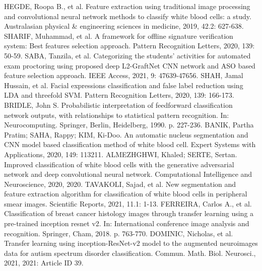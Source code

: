\documentclass[conference]{IEEEtran}
\begin{document}
\begin{thebibliography}{00}
 HEGDE, Roopa B., et al. Feature extraction using traditional image processing and convolutional neural network methods to classify white blood cells: a study. Australasian physical \& engineering sciences in medicine, 2019, 42.2: 627-638. 
 SHARIF, Muhammad, et al. A framework for offline signature verification system: Best features selection approach. Pattern Recognition Letters, 2020, 139: 50-59.
 SABA, Tanzila, et al. Categorizing the students’ activities for automated exam proctoring using proposed deep L2-GraftNet CNN network and ASO based feature selection approach. IEEE Access, 2021, 9: 47639-47656.
 SHAH, Jamal Hussain, et al. Facial expressions classification and false label reduction using LDA and threefold SVM. Pattern Recognition Letters, 2020, 139: 166-173.
 BRIDLE, John S. Probabilistic interpretation of feedforward classification network outputs, with relationships to statistical pattern recognition. In: Neurocomputing. Springer, Berlin, Heidelberg, 1990. p. 227-236.
 BANIK, Partha Pratim; SAHA, Rappy; KIM, Ki-Doo. An automatic nucleus segmentation and CNN model based classification method of white blood cell. Expert Systems with Applications, 2020, 149: 113211. 
 ALMEZHGHWI, Khaled; SERTE, Sertan. Improved classification of white blood cells with the generative adversarial network and deep convolutional neural network. Computational Intelligence and Neuroscience, 2020, 2020.
 TAVAKOLI, Sajad, et al. New segmentation and feature extraction algorithm for classification of white blood cells in peripheral smear images. Scientific Reports, 2021, 11.1: 1-13.
 FERREIRA, Carlos A., et al. Classification of breast cancer histology images through transfer learning using a pre-trained inception resnet v2. In: International conference image analysis and recognition. Springer, Cham, 2018. p. 763-770. 
 DOMINIC, Nicholas, et al. Transfer learning using inception-ResNet-v2 model to the augmented neuroimages data for autism spectrum disorder classification. Commun. Math. Biol. Neurosci., 2021, 2021: Article ID 39. 
\end{thebibliography}
\vspace{12pt}
\color{red}
\end{document}
